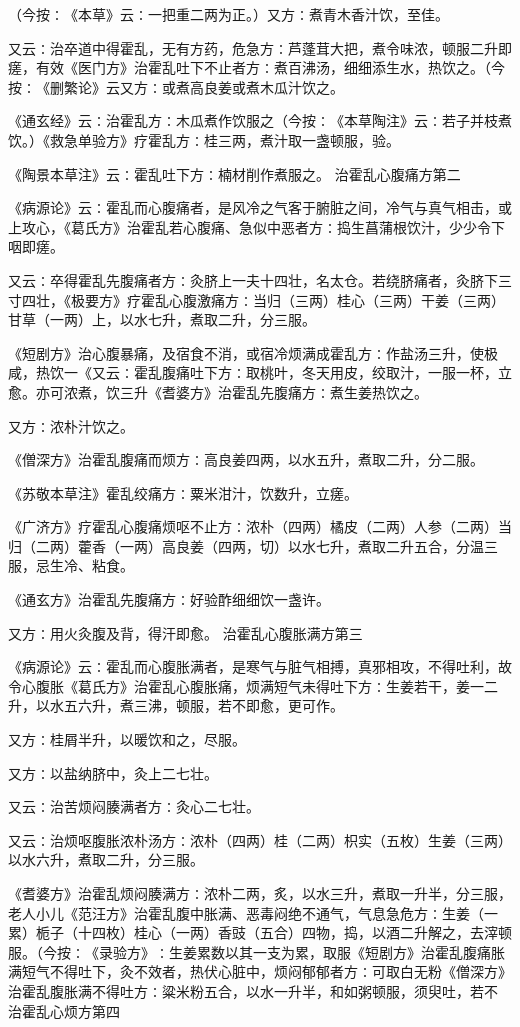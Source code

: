 \documentclass[a4paper,12pt,UTF8,twoside]{ctexbook}
\begin{document}
（今按∶《本草》云∶一把重二两为正。）又方∶煮青木香汁饮，至佳。

又云∶治卒道中得霍乱，无有方药，危急方∶芦蓬茸大把，煮令味浓，顿服二升即瘥，有效《医门方》治霍乱吐下不止者方∶煮百沸汤，细细添生水，热饮之。（今按∶《删繁论》云又方∶或煮高良姜或煮木瓜汁饮之。

《通玄经》云∶治霍乱方∶木瓜煮作饮服之（今按∶《本草陶注》云∶若子并枝煮饮。）《救急单验方》疗霍乱方∶桂三两，煮汁取一盏顿服，验。

《陶景本草注》云∶霍乱吐下方∶楠材削作煮服之。
治霍乱心腹痛方第二

《病源论》云∶霍乱而心腹痛者，是风冷之气客于腑脏之间，冷气与真气相击，或上攻心，《葛氏方》治霍乱若心腹痛、急似中恶者方∶捣生菖蒲根饮汁，少少令下咽即瘥。

又云∶卒得霍乱先腹痛者方∶灸脐上一夫十四壮，名太仓。若绕脐痛者，灸脐下三寸四壮，《极要方》疗霍乱心腹激痛方∶当归（三两）桂心（三两）干姜（三两）甘草（一两）上，以水七升，煮取二升，分三服。

《短剧方》治心腹暴痛，及宿食不消，或宿冷烦满成霍乱方∶作盐汤三升，使极咸，热饮一《又云∶霍乱腹痛吐下方∶取桃叶，冬天用皮，绞取汁，一服一杯，立愈。亦可浓煮，饮三升《耆婆方》治霍乱先腹痛方∶煮生姜热饮之。

又方∶浓朴汁饮之。

《僧深方》治霍乱腹痛而烦方∶高良姜四两，以水五升，煮取二升，分二服。

《苏敬本草注》霍乱绞痛方∶粟米泔汁，饮数升，立瘥。

《广济方》疗霍乱心腹痛烦呕不止方∶浓朴（四两）橘皮（二两）人参（二两）当归（二两）藿香（一两）高良姜（四两，切）以水七升，煮取二升五合，分温三服，忌生冷、粘食。

《通玄方》治霍乱先腹痛方∶好验酢细细饮一盏许。

又方∶用火灸腹及背，得汗即愈。
治霍乱心腹胀满方第三

《病源论》云∶霍乱而心腹胀满者，是寒气与脏气相搏，真邪相攻，不得吐利，故令心腹胀《葛氏方》治霍乱心腹胀痛，烦满短气未得吐下方∶生姜若干，姜一二升，以水五六升，煮三沸，顿服，若不即愈，更可作。

又方∶桂屑半升，以暖饮和之，尽服。

又方∶以盐纳脐中，灸上二七壮。

又云∶治苦烦闷腠满者方∶灸心二七壮。

又云∶治烦呕腹胀浓朴汤方∶浓朴（四两）桂（二两）枳实（五枚）生姜（三两）以水六升，煮取二升，分三服。

《耆婆方》治霍乱烦闷腠满方∶浓朴二两，炙，以水三升，煮取一升半，分三服，老人小儿《范汪方》治霍乱腹中胀满、恶毒闷绝不通气，气息急危方∶生姜（一累）栀子（十四枚）桂心（一两）香豉（五合）四物，捣，以酒二升解之，去滓顿服。（今按∶《录验方》∶生姜累数以其一支为累，取服《短剧方》治霍乱腹痛胀满短气不得吐下，灸不效者，热伏心脏中，烦闷郁郁者方∶可取白无粉《僧深方》治霍乱腹胀满不得吐方∶粱米粉五合，以水一升半，和如粥顿服，须臾吐，若不
治霍乱心烦方第四
\end{document}
